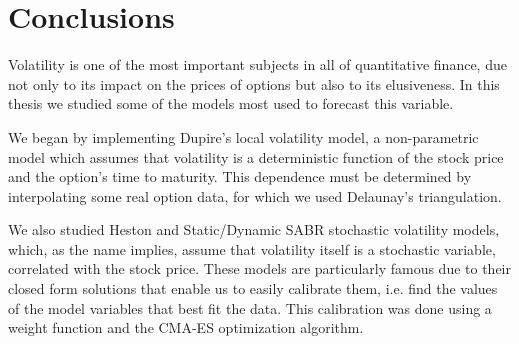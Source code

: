 
\chapter{Conclusions}
\label{chapter:conclusions}
\iffalse
Pricing options remains one of the most important problems in quantitative finance. Black and Scholes developed a model that enables us to easily price European options, but to use it we must assume that volatility remains constant throughout the option's duration.
Market data clearly shows that this assumption doesn't match what the observations, so we require some models to model this dynamic variable.
Volatility is particularly important when dealing with options, as it severely impacts their value. It is also very challenging to estimate it accurately, and even more so to predict its behavior.
\fi

Volatility is one of the most important subjects in all of quantitative finance, due not only to its impact on the prices of options but also to its elusiveness. In this thesis we studied some of the models most used to forecast this variable.

We began by implementing Dupire's local volatility model, a non-parametric model which assumes that volatility is a deterministic function of the stock price and the option's time to maturity. This dependence must be determined by interpolating some real option data, for which we used Delaunay's triangulation.

We also studied Heston and Static/Dynamic SABR stochastic volatility models, which, as the name implies, assume that volatility itself is a stochastic variable, correlated with the stock price. These models are particularly famous due to their closed form solutions that enable us to easily calibrate them, i.e. find the values of the model variables that best fit the data. This calibration was done using a weight function and the CMA-ES optimization algorithm.


